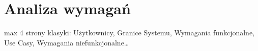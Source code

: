 \chapter{Analiza wymagań}
\label{cha:srs}
max 4 strony klasyki: Użytkownicy, Granice Systemu, Wymagania funkcjonalne, Use Casy, Wymagania niefunkcjonalne…